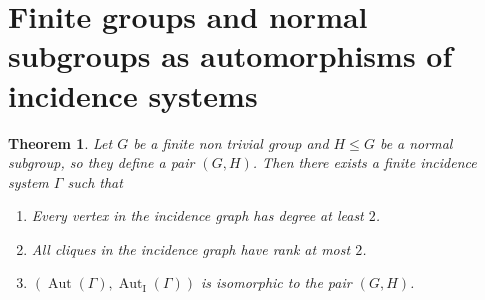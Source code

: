 \documentclass{amsart}
\newtheorem{theorem}{Theorem}[section]
\theoremstyle{definition}
\theoremstyle{remark}
\newcommand{\Aut}{\operatorname{Aut}}
\newcommand{\AutI}{\Aut_{\text{I}}}
\begin{document}
\section{Finite groups and normal subgroups as automorphisms of incidence systems}\label{sec:pair of incidence system}

\begin{theorem}\label{thm:realizing_inicedence_systems}
    Let $G$ be a finite non trivial group and $H\leq G$ be a normal subgroup, so they define a pair $(G,H)$. Then there exists a finite incidence system $\Gamma$ such that
    \begin{enumerate}[label={\rm (\arabic{*})}]
        \item\label{thm:1_realizing_inicedence_systems} Every vertex in the incidence graph has degree at least $2$.
        \item\label{thm:2_realizing_inicedence_systems} All cliques in the incidence graph have rank at most $2$.
        \item\label{thm:3_realizing_inicedence_systems} $(\Aut(\Gamma),\AutI(\Gamma))$ is isomorphic to the pair $(G,H)$.
    \end{enumerate}
\end{theorem}
\end{document}
